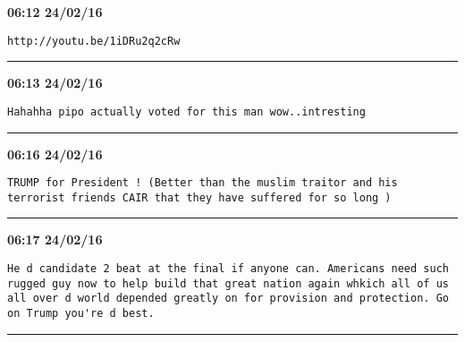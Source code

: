 \begin{adjustwidth}{0cm}{0cm}
\footnotesize \textbf{06:12 24/02/16}

\begin{lstlisting}[breaklines, breakatwhitespace, basicstyle=\small, frame=leftline]
http://youtu.be/1iDRu2q2cRw
\end{lstlisting}
\end{adjustwidth}

\hrule%

\begin{adjustwidth}{0cm}{0cm}
\footnotesize \textbf{06:13 24/02/16}

\begin{lstlisting}[breaklines, breakatwhitespace, basicstyle=\small, frame=leftline]
Hahahha pipo actually voted for this man wow..intresting
\end{lstlisting}
\end{adjustwidth}

\hrule%

\begin{adjustwidth}{0cm}{0cm}
\footnotesize \textbf{06:16 24/02/16}

\begin{lstlisting}[breaklines, breakatwhitespace, basicstyle=\small, frame=leftline]
TRUMP for President ! (Better than the muslim traitor and his terrorist friends CAIR that they have suffered for so long )
\end{lstlisting}
\end{adjustwidth}

\hrule%

\begin{adjustwidth}{0cm}{0cm}
\footnotesize \textbf{06:17 24/02/16}

\begin{lstlisting}[breaklines, breakatwhitespace, basicstyle=\small, frame=leftline]
He d candidate 2 beat at the final if anyone can. Americans need such rugged guy now to help build that great nation again whkich all of us all over d world depended greatly on for provision and protection. Go on Trump you're d best.
\end{lstlisting}
\end{adjustwidth}

\hrule%

